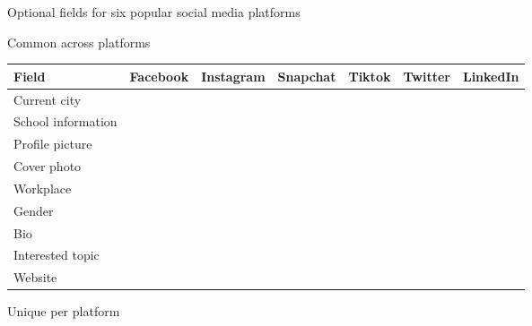\documentclass[11pt]{article} %
\newcommand{\cmark}{\ding{51}}%
\begin{document}
\begin{figure}[tb]
\small
    \caption{Optional fields for six popular social media platforms}
    \label{tab:optional}
        \begin{minipage}{\textwidth}
        \centering
        \caption{Common across platforms}
        \label{tab:optional-a}
            \begin{tabular}{lcccccc} 
            \toprule
Field &   Facebook &   Instagram &   Snapchat &   Tiktok &   Twitter &   LinkedIn \\ \midrule    
Current city       & \cmark &        &  &        & \cmark & \cmark \\ \hline 
School information & \cmark &        &  &        & \cmark & \cmark \\ \hline 
Profile picture    & \cmark & \cmark &  & \cmark & \cmark & \cmark \\ \hline
Cover photo        & \cmark &        &  &        & \cmark & \cmark \\ \hline
Workplace          & \cmark &        &  &        &        & \cmark \\ \hline
Gender             & \cmark & \cmark &  &        &        &        \\ \hline
Bio                & \cmark & \cmark &  &        & \cmark & \cmark \\ \hline
Interested topic   &        &        &  &        & \cmark & \cmark \\ \hline
Website            & \cmark &        &  &        & \cmark &       \\ \bottomrule
            \end{tabular} 
    \end{minipage}%
    \vspace{1em}
    \begin{minipage}{\textwidth}      
        \centering
        \caption{Unique per platform}
        \label{tab:optional-b}
                             

\end{minipage}
\end{figure}
\end{document}
